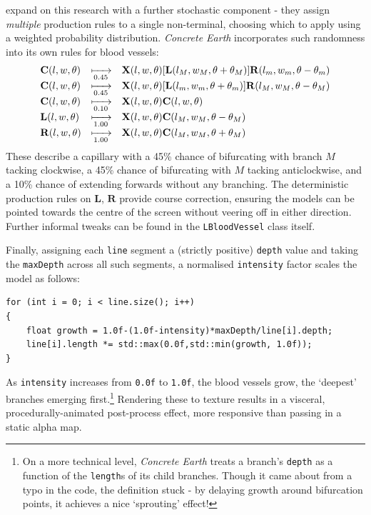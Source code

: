 \documentclass[a4paper, 11pt]{article}
\begin{document}
\begin{flushleft}
\vspace{5pt}\noindent
\citet{liuSimulationBloodVessels} expand on this research with a further stochastic component - they assign \textit{multiple} production rules to a single non-terminal, choosing which to apply using a weighted probability distribution. \textit{Concrete Earth} incorporates such randomness into its own rules for blood vessels:
$$\begin{matrix*}[l]
\mathbf{C}(l,w,\theta) &\xmapsto[0.45]{} &\mathbf{X}(l,w,\theta)[\mathbf{L}(l_M,w_M,\theta+\theta_M)]\mathbf{R}(l_m,w_m,\theta-\theta_m) \\
\mathbf{C}(l,w,\theta) &\xmapsto[0.45]{} &\mathbf{X}(l,w,\theta)[\mathbf{L}(l_m,w_m,\theta+\theta_m)]\mathbf{R}(l_M,w_M,\theta-\theta_M) \\
\mathbf{C}(l,w,\theta) &\xmapsto[0.10]{} &\mathbf{X}(l,w,\theta)\mathbf{C}(l,w,\theta) \\
\mathbf{L}(l,w,\theta) &\xmapsto[1.00]{} &\mathbf{X}(l,w,\theta)\mathbf{C}(l_M,w_M,\theta-\theta_M) \\
\mathbf{R}(l,w,\theta) &\xmapsto[1.00]{} &\mathbf{X}(l,w,\theta)\mathbf{C}(l_M,w_M,\theta+\theta_M)
\end{matrix*}$$
These describe a capillary with a 45\% chance of bifurcating with branch $M$ tacking clockwise, a 45\% chance of bifurcating with $M$ tacking anticlockwise, and a 10\% chance of extending forwards without any branching. The deterministic production rules on $\mathbf{L}$, $\mathbf{R}$ provide course correction, ensuring the models can be pointed towards the centre of the screen without veering off in either direction. Further informal tweaks can be found in the \texttt{LBloodVessel} class itself. 



\vspace{5pt}\noindent
Finally, assigning each \texttt{line} segment a (strictly positive) \texttt{depth} value and taking the \texttt{maxDepth} across all such segments, a normalised \texttt{intensity} factor scales the model as follows: 
\begin{center} %
\begin{BVerbatim}
for (int i = 0; i < line.size(); i++)
{
    float growth = 1.0f-(1.0f-intensity)*maxDepth/line[i].depth;
    line[i].length *= std::max(0.0f,std::min(growth, 1.0f));
}
\end{BVerbatim}
\end{center}
As \texttt{intensity} increases from \texttt{0.0f} to \texttt{1.0f}, the blood vessels grow, the `deepest' branches emerging first.\footnote{On a more technical level, \textit{Concrete Earth} treats a branch's \texttt{depth} as a function of the \texttt{length}s of its child branches. Though it came about from a typo in the code, the definition stuck - by delaying growth around bifurcation points, it achieves a nice `sprouting' effect!} 
Rendering these to texture results in a visceral, procedurally-animated post-process effect, more responsive than passing in a static alpha map. 


\end{flushleft}
\end{document}
